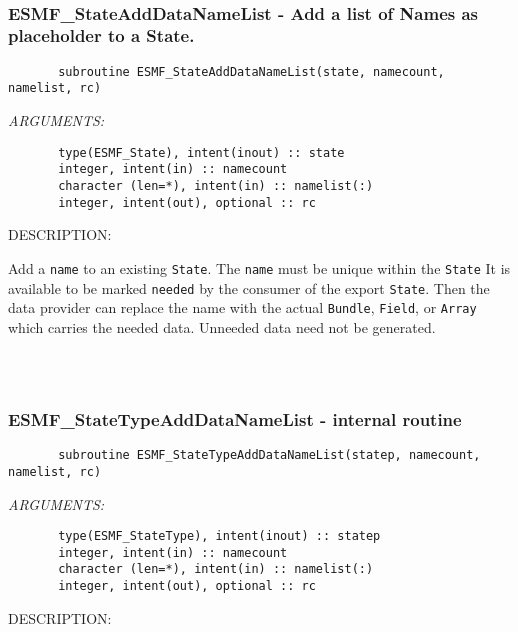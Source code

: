 \begin{verbatim} \end{verbatim}
 
 
\mbox{}\hrulefill\ 
 
\subsubsection{ESMF\_StateAddDataNameList - Add a list of Names as placeholder to a State.}

 
\begin{verbatim}       subroutine ESMF_StateAddDataNameList(state, namecount, namelist, rc)\end{verbatim}{\em ARGUMENTS:}
\begin{verbatim}       type(ESMF_State), intent(inout) :: state
       integer, intent(in) :: namecount
       character (len=*), intent(in) :: namelist(:)
       integer, intent(out), optional :: rc
       \end{verbatim}
{\sf DESCRIPTION:\\ }


        Add a {\tt name} to an existing {\tt State}.
        The {\tt name} must be unique within the {\tt State}
        It is available to be marked {\tt needed} by the
        consumer of the export {\tt State}. Then the data 
        provider can replace the name with the actual {\tt Bundle},
        {\tt Field}, or {\tt Array} which carries the needed data.
        Unneeded data need not be generated.
  
\begin{verbatim} \end{verbatim}
 
 
\mbox{}\hrulefill\ 
 
\subsubsection{ESMF\_StateTypeAddDataNameList - internal routine}

 
\begin{verbatim}       subroutine ESMF_StateTypeAddDataNameList(statep, namecount, namelist, rc)\end{verbatim}{\em ARGUMENTS:}
\begin{verbatim}       type(ESMF_StateType), intent(inout) :: statep
       integer, intent(in) :: namecount
       character (len=*), intent(in) :: namelist(:)
       integer, intent(out), optional :: rc
       \end{verbatim}
{\sf DESCRIPTION:\\ }


